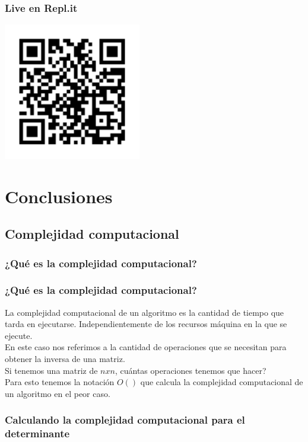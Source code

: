 \documentclass{beamer}
\begin{document}
    \begin{frame}
        \frametitle{Live en Repl.it}
        \begin{center}
            \includegraphics[width=170pt]{images/QR_replit.png}
        \end{center}
    \end{frame}

    \section{Conclusiones}
    \subsection{Complejidad computacional}
    \subsubsection{¿Qué es la complejidad computacional?}

    \begin{frame}
        \frametitle{¿Qué es la complejidad computacional?}
        La complejidad computacional de un algoritmo es la cantidad de tiempo que tarda en ejecutarse. Independientemente
        de los recursos máquina en la que se ejecute.\\
        En este caso nos referimos a la cantidad de operaciones que se necesitan para obtener la inversa de una matriz.\\
        Si tenemos una matriz de $n x n$, cuántas operaciones tenemos que hacer?\\
        Para esto tenemos la notación $O()$ que calcula la complejidad computacional de un algoritmo en el peor caso.\\
    \end{frame}

    \subsubsection{Calculando la complejidad computacional para el determinante}
\end{document}
